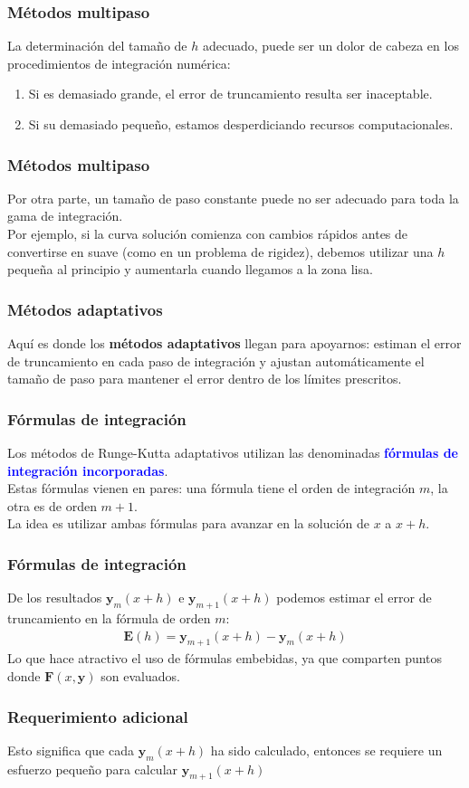 \documentclass[12pt]{beamer}
\begin{document}
\begin{frame}
\frametitle{Métodos multipaso}
La determinación del tamaño de $h$ adecuado, puede ser un dolor de cabeza en los procedimientos de integración numérica:
\pause
{}
\begin{enumerate}[<+->]
\item Si es demasiado grande, el error de truncamiento resulta ser inaceptable.
\item Si su demasiado pequeño, estamos desperdiciando recursos computacionales.
\end{enumerate}
\end{frame}
\begin{frame}
\frametitle{Métodos multipaso}
Por otra parte, un tamaño de paso constante puede no ser adecuado para toda la gama de integración.
\\
\bigskip
\pause
Por ejemplo, si la curva solución comienza con cambios rápidos antes de convertirse en suave (como en un problema de rigidez), debemos utilizar una $h$ pequeña al principio y aumentarla cuando llegamos a la zona lisa.
\end{frame}
\begin{frame}
\frametitle{Métodos adaptativos}
Aquí es donde los \textbf{\textcolor{carmine}{métodos adaptativos}} llegan para apoyarnos: \pause estiman el error de truncamiento en cada paso de integración y ajustan automáticamente el tamaño de paso para mantener el error dentro de los límites prescritos.
\end{frame}
\begin{frame}
\frametitle{Fórmulas de integración}
Los métodos de Runge-Kutta adaptativos utilizan las denominadas \textbf{\textcolor{blue}{fórmulas de integración incorporadas}}.
\\
\medskip
\pause
Estas fórmulas vienen en pares: \pause una fórmula tiene el orden de integración $m$, \pause la otra es de orden $m + 1$.
\\
\bigskip
\pause
 La idea es utilizar ambas fórmulas para avanzar en la solución de $x$ a $x + h$.
\end{frame}
\begin{frame}
\frametitle{Fórmulas de integración}
De los resultados $\mathbf{y}_{m}(x+h)$ e $\mathbf{y}_{m+1}(x+h)$ podemos estimar el error de truncamiento en la fórmula de orden $m$:
\pause
\begin{align*}
\mathbf{E}(h) = \mathbf{y}_{m+1} (x + h) - \mathbf{y}_{m} (x + h)
\end{align*}
Lo que hace atractivo el uso de fórmulas embebidas, ya que comparten puntos donde $\mathbf{F} (x, \mathbf{y})$ son evaluados.
\end{frame}
\begin{frame}
\frametitle{Requerimiento adicional}
Esto significa que cada $\mathbf{y}_{m} (x + h)$ ha sido calculado, entonces se requiere un esfuerzo pequeño para calcular $\mathbf{y}_{m+1} (x + h)$
\end{frame}
\end{document}
